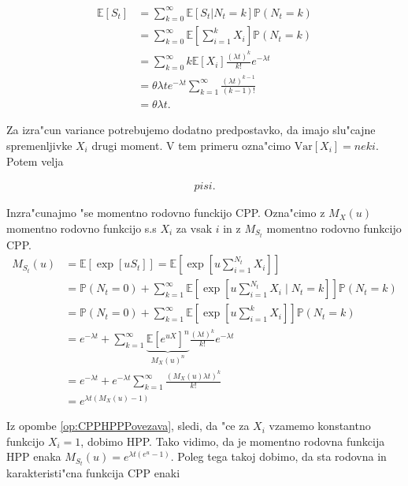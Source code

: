 \documentclass[12pt,a4paper]{amsart}
\theoremstyle{definition} %
\theoremstyle{plain} %
\newcommand{\E}{\mathbb{E}}
\newcommand{\Prob}{\mathbb{P}}
\newcommand{\1}{\mathds{1}}
\newcommand{\Var}[1]{\text{Var}\left[#1\right]}
\begin{document}
    \begin{align*}
        \E\left[S_t\right] &= \sum_{k=0}^{\infty} \E\left[S_t | N_t = k\right] \Prob\left(N_t = k\right)\\
                           &= \sum_{k=0}^{\infty} \E\left[\sum_{i=1}^{k} X_i\right] \Prob\left(N_t = k\right)\\
                           &= \sum_{k=0}^{\infty}k\E\left[X_i\right]\frac{(\lambda t)^k}{k!}e^{-\lambda t}\\
                           &= \theta\lambda te^{-\lambda t}\sum_{k=1}^{\infty}\frac{(\lambda t)^{k-1}}{(k-1)!}\\
                           &= \theta\lambda t.
    \end{align*}

    \noindent
    Za izra"cun variance potrebujemo dodatno predpostavko, da imajo slu"cajne spremenljivke $X_i$ 
    drugi moment. V tem primeru ozna"cimo $\Var{X_i} = neki$. Potem velja

    \begin{align*}
        pisi.
    \end{align*}

    \noindent
    Inzra"cunajmo "se momentno rodovno funckijo CPP. Ozna"cimo z $M_X(u)$ momentno rodovno funkcijo 
    s.s $X_i$ za vsak $i$ in z $M_{S_t}$ momentno rodovno funkcijo CPP.
    \begin{align*}
        M_{S_t}(u) &= \E\left[\exp\left[uS_t\right]\right] =
                     \E\left[\exp\left[u\sum_{i = 1}^{N_t}X_i\right]\right]\\
                   &= \Prob\left(N_t = 0\right) + \sum_{k=1}^{\infty}
                       \E\left[\exp\left[u\sum_{i = 1}^{N_t}X_i\mid N_t=k\right]\right]\Prob\left(N_t = k\right)\\ 
                   &= \Prob\left(N_t = 0\right) + \sum_{k=1}^{\infty}
                       \E\left[\exp\left[u\sum_{i = 1}^kX_i\right]\right]\Prob\left(N_t = k\right)\\
                   &= e^{-\lambda t} + \sum_{k=1}^{\infty}
                       \underbrace{\E\left[e^{uX}\right]^n}_{M_X(u)^n}\frac{(\lambda t)^k}{k!}e^{-\lambda t}\\ 
                   &= e^{-\lambda t} + e^{-\lambda t}\sum_{k=1}^\infty\frac{\left(M_X(u)\lambda t\right)^k}{k!}\\
                   &= e^{\lambda t\left(M_X(u) - 1\right)}    
    \end{align*}

    Iz opombe \ref{op:CPPHPPPovezava}, sledi, da "ce za $X_i$ vzamemo konstantno funkcijo 
    $X_i = 1$, dobimo HPP. Tako vidimo, da je momentno rodovna funkcija HPP enaka 
    $M_{S_t}(u) = e^{\lambda t\left(e^u - 1\right)}$. Poleg tega takoj dobimo, da sta rodovna in
    karakteristi"cna funkcija CPP enaki
\end{document}
